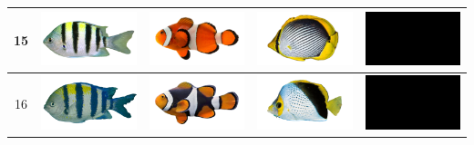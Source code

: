 \begin{longtable}{|c|c|c|c|c|}
    15 & \includegraphics[width=3cm]{gambar/abudefduf/A15} & \includegraphics[width=3cm]{gambar/amphiprion/A15} & \includegraphics[width=3cm]{gambar/chaetodon/C15} & \includegraphics[width=3cm]{gambar/negative_examples/N15} \\
    \hline
    16 & \includegraphics[width=3cm]{gambar/abudefduf/A16} & \includegraphics[width=3cm]{gambar/amphiprion/A16} & \includegraphics[width=3cm]{gambar/chaetodon/C16} & \includegraphics[width=3cm]{gambar/negative_examples/N16} \\
    \hline

\end{longtable}
